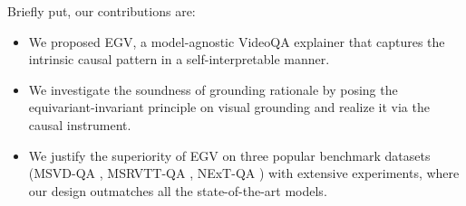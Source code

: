 Briefly put, our contributions are: 
\begin{itemize}[leftmargin=*]
    \item We proposed EGV, a model-agnostic VideoQA explainer that captures the intrinsic causal pattern in a self-interpretable manner.
    
    \item We investigate the soundness of grounding rationale by posing the equivariant-invariant principle on visual grounding and realize it via the causal instrument.
    
    \item We justify the superiority of EGV on three popular benchmark datasets (\ie MSVD-QA \cite{DBLP:conf/mm/XuZX0Z0Z17}, MSRVTT-QA \cite{DBLP:conf/mm/XuZX0Z0Z17},  NExT-QA \cite{DBLP:conf/cvpr/XiaoSYC21}) with extensive experiments, where our design outmatches all the state-of-the-art models.
\end{itemize}













